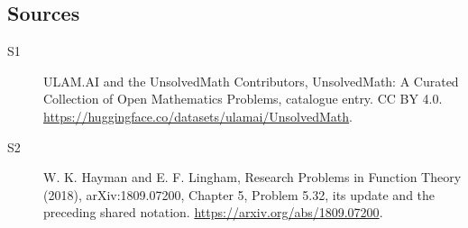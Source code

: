 \documentclass[11pt]{article}
\begin{document}
\subsection{Sources}
\begin{description}
\item[\hypertarget{source:statement:1}{S1}] ULAM.AI and the UnsolvedMath Contributors, UnsolvedMath: A Curated Collection of Open Mathematics Problems, catalogue entry. CC BY 4.0. \url{https://huggingface.co/datasets/ulamai/UnsolvedMath}.
\item[\hypertarget{source:statement:2}{S2}] W. K. Hayman and E. F. Lingham, Research Problems in Function Theory (2018), arXiv:1809.07200, Chapter 5, Problem 5.32, its update and the preceding shared notation. \url{https://arxiv.org/abs/1809.07200}.
\end{description}
\label{end:statement}
\end{document}
